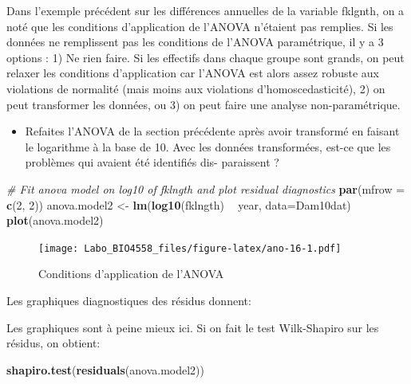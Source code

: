 \documentclass[12pt,]{book}
\newenvironment{Shaded}{\begin{snugshade}}{\end{snugshade}}
\newcommand{\CommentTok}[1]{\textcolor[rgb]{0.37,0.37,0.37}{\textit{#1}}}
\newcommand{\DataTypeTok}[1]{\textcolor[rgb]{0.27,0.27,0.27}{#1}}
\newcommand{\DecValTok}[1]{\textcolor[rgb]{0.06,0.06,0.06}{#1}}
\newcommand{\KeywordTok}[1]{\textcolor[rgb]{0.27,0.27,0.27}{\textbf{#1}}}
\newcommand{\NormalTok}[1]{#1}
\newcommand{\OperatorTok}[1]{\textcolor[rgb]{0.43,0.43,0.43}{\textbf{#1}}}
\newcommand{\StringTok}[1]{\textcolor[rgb]{0.5,0.5,0.5}{#1}}
\providecommand{\tightlist}{%
  \setlength{\itemsep}{0pt}\setlength{\parskip}{0pt}}
\begin{document}
Dans l'exemple précédent sur les différences annuelles de la variable fklgnth, on a noté que les conditions d'application de l'ANOVA n'étaient pas remplies. Si les données ne remplissent pas les conditions de l'ANOVA paramétrique, il y a 3 options : 1) Ne rien faire. Si les effectifs dans chaque groupe sont grands, on peut relaxer les conditions d'application car l'ANOVA est alors assez robuste aux violations de normalité (mais moins aux violations d'homoscedasticité), 2) on peut transformer les données, ou 3) on peut faire une analyse non-paramétrique.

\begin{itemize}
\tightlist
\item
  Refaites l'ANOVA de la section précédente après avoir transformé en faisant le logarithme à la base de 10. Avec les données transformées, est-ce que les problèmes qui avaient été identifiés dis- paraissent ?
\end{itemize}

\begin{Shaded}
\begin{Highlighting}[]
\CommentTok{# Fit anova model on log10 of fklngth and plot residual diagnostics}
\KeywordTok{par}\NormalTok{(}\DataTypeTok{mfrow =} \KeywordTok{c}\NormalTok{(}\DecValTok{2}\NormalTok{, }\DecValTok{2}\NormalTok{))}
\NormalTok{anova.model2 <-}\StringTok{ }\KeywordTok{lm}\NormalTok{(}\KeywordTok{log10}\NormalTok{(fklngth) }\OperatorTok{~}\StringTok{ }\NormalTok{year, }\DataTypeTok{data=}\NormalTok{Dam10dat)}
\KeywordTok{plot}\NormalTok{(anova.model2)}
\end{Highlighting}
\end{Shaded}

\begin{figure}
\centering
\texttt{[image: Labo\_BIO4558\_files/figure-latex/ano-16-1.pdf]}
\caption{\label{fig:ano-16}Conditions d'application de l'ANOVA}
\end{figure}

Les graphiques diagnostiques des résidus donnent:

Les graphiques sont à peine mieux ici. Si on fait le test Wilk-Shapiro sur les résidus, on obtient:

\begin{Shaded}
\begin{Highlighting}[]
\KeywordTok{shapiro.test}\NormalTok{(}\KeywordTok{residuals}\NormalTok{(anova.model2))}
\end{Highlighting}
\end{Shaded}
\end{document}
